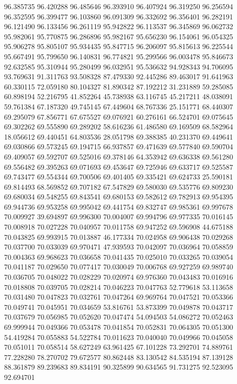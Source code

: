 96.385735
96.420288
96.485646
96.393910
96.407924
96.319250
96.256594
96.352595
96.399477
96.103860
96.091309
96.332692
96.356401
96.282191
96.121490
96.133456
96.261119
95.942822
96.113537
96.345869
96.062732
95.982061
95.770875
96.286896
95.982167
95.656230
96.154061
96.054325
95.906278
95.805107
95.934435
95.847715
96.206097
95.815613
96.225544
95.667491
95.799650
96.140831
96.774821
95.299566
96.003478
95.846673
92.632585
95.310944
95.280499
96.032951
95.536632
94.928343
94.706095
93.769631
91.311763
93.508328
87.479330
92.445286
89.463017
91.641963
60.330115
72.059180
80.104327
81.890342
87.192212
31.231889
59.285085
60.898194
52.216795
41.852264
45.738938
63.116745
45.217211
48.038091
59.761384
67.187320
49.745145
67.449604
68.767336
25.151771
68.440307
69.295079
67.856771
67.675527
69.076921
60.276161
66.524701
69.075645
69.302262
69.555890
69.289202
58.616236
61.486580
69.169509
68.582964
18.056612
69.440451
64.803536
28.051798
69.388385
40.231370
69.449641
69.030866
69.573245
69.194715
66.937857
69.471639
69.577840
69.590704
69.409057
69.592707
69.525016
69.378146
64.353942
69.636338
69.561280
69.556482
69.395263
69.071693
69.453647
69.725946
69.633717
69.525587
69.743477
69.554344
69.700506
69.401405
69.335421
69.624733
25.590181
69.814493
68.569852
69.707182
67.547829
69.580030
69.535776
69.809230
69.680034
69.548255
69.843541
69.680153
69.582612
69.782913
69.954395
69.944736
69.953258
69.995042
69.441754
69.832747
69.985361
69.997678
70.009927
39.694897
69.996300
70.004007
69.994796
69.977335
70.016145
70.008918
70.027228
70.040957
70.011758
69.947252
69.596908
44.675188
70.043825
69.993915
70.013887
46.177334
70.024958
69.906438
70.029268
70.037700
70.033039
69.970471
47.939593
70.042097
70.036964
70.058859
70.004363
69.968623
70.036658
70.041435
70.025010
70.033265
70.039054
70.041187
70.029650
70.077417
70.030049
70.006768
69.927259
69.989740
70.036705
70.048022
70.028229
70.020974
69.976360
70.043483
70.016916
70.018808
70.039705
70.028214
70.046223
70.047763
52.779618
53.113658
70.031480
70.047823
70.032761
70.047264
69.969764
70.047521
70.053366
70.049741
70.045951
70.034659
53.816761
53.873399
70.049878
70.043717
70.037679
70.056985
70.052620
70.047474
54.094503
54.086272
70.052463
69.999944
70.049366
70.053478
70.041854
70.052831
70.064305
70.051300
54.419284
70.055883
54.522784
70.011623
70.040040
70.049966
70.045058
70.051011
70.058514
58.627249
63.961425
67.101228
73.292701
74.889761
77.228280
78.270702
79.672577
80.862448
83.130542
84.535194
87.139128
88.361879
89.239683
89.834191
90.325899
90.634565
91.731275
92.523095
92.694701
